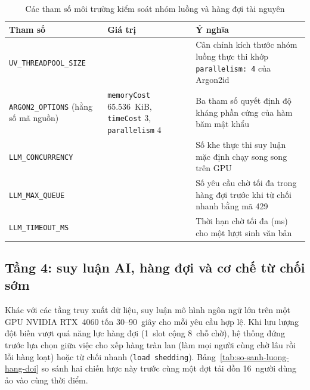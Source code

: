 \begin{table}[htbp]
\centering
\caption{Các tham số môi trường kiểm soát nhóm luồng và hàng đợi tài nguyên}
\label{tab:tham-so-thread-pool-llm}
\small
\begin{tabularx}{\textwidth}{
  >{\raggedright\arraybackslash}p{4.3cm}
  >{\raggedright\arraybackslash}p{4.5cm}
  >{\raggedright\arraybackslash}X
}
\toprule
\textbf{Tham số} & \textbf{Giá trị} & \textbf{Ý nghĩa} \\
\midrule
\texttt{UV\_\allowbreak{}THREADPOOL\_\allowbreak{}SIZE} & 4 & Cân chỉnh kích thước nhóm luồng thực thi khớp \texttt{parallelism: 4} của Argon2id \\
\midrule
\texttt{ARGON2\_OPTIONS} (hằng số mã nguồn) & \texttt{memoryCost} 65.536~KiB, \texttt{timeCost} 3, \texttt{parallelism} 4 & Ba tham số quyết định độ kháng phần cứng của hàm băm mật khẩu \\
\midrule
\texttt{LLM\_CONCURRENCY} & 1 & Số khe thực thi suy luận mặc định chạy song song trên GPU \\
\midrule
\texttt{LLM\_MAX\_QUEUE} & 8 & Số yêu cầu chờ tối đa trong hàng đợi trước khi từ chối nhanh bằng mã 429 \\
\midrule
\texttt{LLM\_TIMEOUT\_MS} & 60.000 & Thời hạn chờ tối đa (ms) cho một lượt sinh văn bản \\
\bottomrule
\end{tabularx}
\end{table}

\subsection{Tầng 4: suy luận AI, hàng đợi và cơ chế từ chối sớm}
\label{subsec:tang-4-llm-queue}

Khác với các tầng truy xuất dữ liệu, suy luận mô hình ngôn ngữ lớn trên một GPU NVIDIA RTX~4060 tốn 30--90~giây cho mỗi yêu cầu hợp lệ. Khi lưu lượng đột biến vượt quá năng lực hàng đợi (1~slot cộng 8~chỗ chờ), hệ thống đứng trước lựa chọn giữa việc cho xếp hàng tràn lan (làm mọi người cùng chờ lâu rồi lỗi hàng loạt) hoặc từ chối nhanh (\texttt{load shedding}). Bảng~\ref{tab:so-sanh-luong-hang-doi} so sánh hai chiến lược này trước cùng một đợt tải dồn 16~người dùng ảo vào cùng thời điểm.


